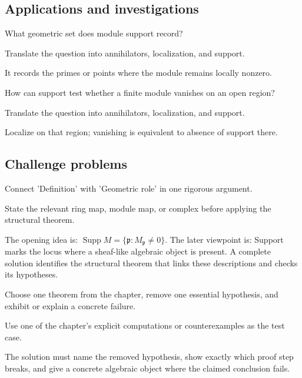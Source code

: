 \subsection*{Applications and investigations}

\begin{exercise}\label{exr:v16-expand-13}
What geometric set does module support record?
\end{exercise}
\begin{hint}
Translate the question into annihilators, localization, and support.
\end{hint}
\begin{solution}
It records the primes or points where the module remains locally nonzero.
\end{solution}

\begin{exercise}\label{exr:v16-expand-14}
How can support test whether a finite module vanishes on an open region?
\end{exercise}
\begin{hint}
Translate the question into annihilators, localization, and support.
\end{hint}
\begin{solution}
Localize on that region; vanishing is equivalent to absence of support there.
\end{solution}

\subsection*{Challenge problems}

\begin{exercise}\label{exr:v16-expand-15}
Connect 'Definition' with 'Geometric role' in one rigorous argument.
\end{exercise}
\begin{hint}
State the relevant ring map, module map, or complex before applying the structural theorem.
\end{hint}
\begin{solution}
The opening idea is: $\operatorname{Supp}M=\{\mathfrak p:M_{\mathfrak p}\ne0\}$. The later viewpoint is: Support marks the locus where a sheaf-like algebraic object is present. A complete solution identifies the structural theorem that links these descriptions and checks its hypotheses.
\end{solution}

\begin{exercise}\label{exr:v16-expand-16}
Choose one theorem from the chapter, remove one essential hypothesis, and exhibit or explain a concrete failure.
\end{exercise}
\begin{hint}
Use one of the chapter's explicit computations or counterexamples as the test case.
\end{hint}
\begin{solution}
The solution must name the removed hypothesis, show exactly which proof step breaks, and give a concrete algebraic object where the claimed conclusion fails.
\end{solution}

